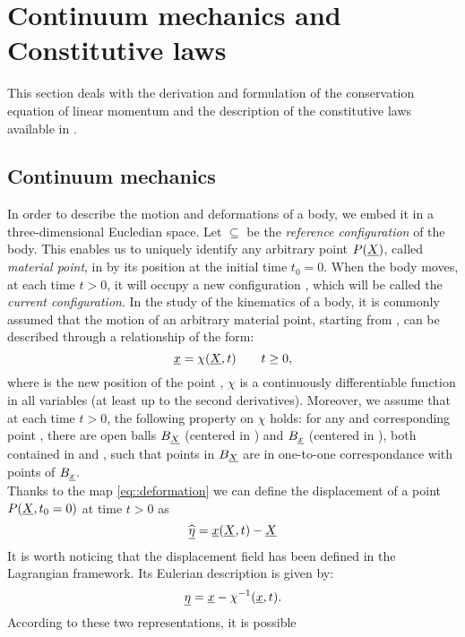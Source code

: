 \section{Continuum mechanics and Constitutive laws} This section deals
with the derivation and formulation of the conservation equation of
linear momentum and the description of the constitutive laws available
in \LV.

\subsection{Continuum mechanics}
\label{sct-Continuum} In order to describe the motion and deformations
of a body, we embed it in a three-dimensional Eucledian space. Let
\RefCon $\subseteq$ \Real be the \textit{reference configuration} of
the body. This enables us to uniquely identify any arbitrary point
$P(\underline{X})$, called \textit{material point}, in \RefCon by its position
at the initial time $t_0=0$. When the body moves, at each time $t>0$,
it will occupy a new configuration \CurCon, which will be called the
\textit{current configuration}. In the study of the kinematics of a
body, it is commonly assumed that the motion of an arbitrary material
point, starting from \pos, can be described through a relationship of
the form:
\begin{equation} \underline{x}=\chi(\underline{X},t)\qquad t\geq0,
  \label{eq::deformation}
\end{equation} where \npos is the new position of the point \pos,
$\chi$ is a continuously differentiable function in all variables (at
least up to the second derivatives). Moreover, we assume that at each
time $t>0$, the following property on $\chi$ holds: for any \pos and
corresponding point \npos, there are open balls $B_{\underline{X}}$ (centered
in \pos) and $B_{\underline{x}}$ (centered in \npos), both contained in
\RefCon and \CurCon, such that points in $B_{\underline{X}}$ are in one-to-one
correspondance with points of $B_{\underline{x}}$.\\ Thanks to the map
\eqref{eq::deformation} we can define the displacement of a point
$P(\underline{X},t_0=0)$ at time $t>0$ as
\begin{equation} \widehat{\underline{\eta}}=\underline{x}(\underline{X},t)-\underline{X}
\label{eq::displacementL}
\end{equation} It is worth noticing that the displacement field has
been defined in the Lagrangian framework. Its Eulerian description is
given by:
\begin{equation} \underline{\eta}=\underline{x}-\chi^{-1}(\underline{x},t).
  \label{eq::displacementE}
\end{equation} According to these two representations, it is possible
